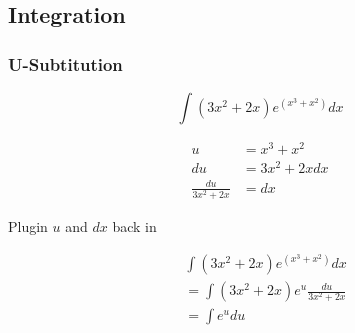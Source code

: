   \subsection{Integration}

    \subsubsection{U-Subtitution}

      \begin{displaymath}
        \int \left( 3x^{2} + 2x \right) e^{\left( x^{3} + x^{2} \right)} dx
      \end{displaymath}

      \begin{align*}
        u &= x^{3} + x^{2} \\
        du &= 3x^{2} + 2x dx \\
        \frac{du}{3x^{2} + 2x} &= dx
      \end{align*}

      Plugin $ u $ and $ dx $ back in

      \begin{align*}
        &\int \left( 3x^{2} + 2x \right) e^{\left( x^{3} + x^{2} \right)} dx \\
        &= \int \left( 3x^{2} + 2x \right) e^{u} \frac{du}{3x^{2} + 2x} \\
        &= \int e^{u} du
      \end{align*}